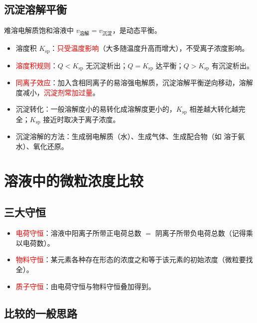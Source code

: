        \subsection{沉淀溶解平衡}

            难溶电解质饱和溶液中 \(v_\text{溶解} = v_\text{沉淀}\)，是动态平衡。

            \begin{itemize}
                \item 溶度积 \(K_\text{sp}\)：\textcolor{red}{只受温度影响}（大多随温度升高而增大），不受离子浓度影响。
                \item \textcolor{red}{溶度积规则}：\(Q < K_\text{sp}\) 无沉淀析出；\(Q = K_\text{sp}\) 达平衡；\(Q > K_\text{sp}\) 有沉淀析出。
                \item \textcolor{red}{同离子效应}：加入含相同离子的易溶强电解质，沉淀溶解平衡逆向移动，溶解度减小，\textcolor{red}{沉淀剂常加过量}。
                \item 沉淀转化：一般溶解度小的易转化成溶解度更小的，\(K_\text{sp}\) 相差越大转化越完全；\(K_\text{sp}\) 接近时取决于离子浓度。
                \item 沉淀溶解的方法：生成弱电解质（水）、生成气体、生成配合物（如  溶于氨水）、氧化还原。
            \end{itemize}

    \section{溶液中的微粒浓度比较}\label{app:知识点-微粒浓度}

        \subsection{三大守恒}

            \begin{itemize}
                \item \textcolor{red}{电荷守恒}：溶液中阳离子所带正电荷总数 \(=\) 阴离子所带负电荷总数（记得乘以电荷数）。
                \item \textcolor{red}{物料守恒}：某元素各种存在形态的浓度之和等于该元素的初始浓度（微粒要找全）。
                \item \textcolor{red}{质子守恒}：由电荷守恒与物料守恒叠加得到。
            \end{itemize}

        \subsection{比较的一般思路}

